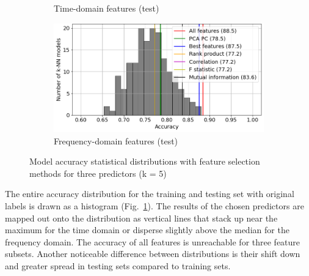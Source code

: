 \begin{figure}[h]
\begin{subfigure}[b]{0.48\textwidth}
        \caption{Time-domain features (test)}
    \end{subfigure}
    \hfill
    \begin{subfigure}[b]{0.48\textwidth}
        \includegraphics[width=\textwidth]{assets/results/feature-combinations/model-distr-fsel-k5-f3-FD-test.png}
        \caption{Frequency-domain features (test)}
    \end{subfigure}
    \caption{Model accuracy statistical distributions with feature selection methods for three predictors (k = 5)}
    \label{fig:evaluation:fsel-model-distr}
\end{figure}

The entire accuracy distribution for the training and testing set with original labels is drawn as a histogram (Fig.~\ref{fig:evaluation:fsel-model-distr}). The results of the chosen predictors are mapped out onto the distribution as vertical lines that stack up near the maximum for the time domain or disperse slightly above the median for the frequency domain. The accuracy of all features is unreachable for three feature subsets. Another noticeable difference between distributions is their shift down and greater spread in testing sets compared to training sets.

